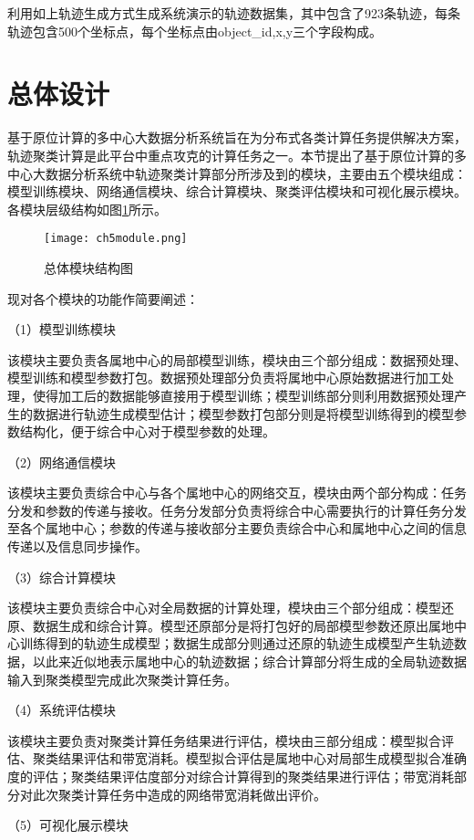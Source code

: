 利用如上轨迹生成方式生成系统演示的轨迹数据集，其中包含了923条轨迹，每条轨迹包含500个坐标点，每个坐标点由object\_id,x,y三个字段构成。

\section{总体设计}
基于原位计算的多中心大数据分析系统旨在为分布式各类计算任务提供解决方案，轨迹聚类计算是此平台中重点攻克的计算任务之一。本节提出了基于原位计算的多中心大数据分析系统中轨迹聚类计算部分所涉及到的模块，主要由五个模块组成：模型训练模块、网络通信模块、综合计算模块、聚类评估模块和可视化展示模块。各模块层级结构如图\ref{ch5module}所示。
\begin{figure}[H]
	\texttt{[image: ch5module.png]}
	\caption{总体模块结构图}
	\label{ch5module}
\end{figure}

现对各个模块的功能作简要阐述：

（1）模型训练模块

该模块主要负责各属地中心的局部模型训练，模块由三个部分组成：数据预处理、模型训练和模型参数打包。数据预处理部分负责将属地中心原始数据进行加工处理，使得加工后的数据能够直接用于模型训练；模型训练部分则利用数据预处理产生的数据进行轨迹生成模型估计；模型参数打包部分则是将模型训练得到的模型参数结构化，便于综合中心对于模型参数的处理。
 
（2）网络通信模块

该模块主要负责综合中心与各个属地中心的网络交互，模块由两个部分构成：任务分发和参数的传递与接收。任务分发部分负责将综合中心需要执行的计算任务分发至各个属地中心；参数的传递与接收部分主要负责综合中心和属地中心之间的信息传递以及信息同步操作。

（3）综合计算模块

该模块主要负责综合中心对全局数据的计算处理，模块由三个部分组成：模型还原、数据生成和综合计算。模型还原部分是将打包好的局部模型参数还原出属地中心训练得到的轨迹生成模型；数据生成部分则通过还原的轨迹生成模型产生轨迹数据，以此来近似地表示属地中心的轨迹数据；综合计算部分将生成的全局轨迹数据输入到聚类模型完成此次聚类计算任务。

（4）系统评估模块

该模块主要负责对聚类计算任务结果进行评估，模块由三部分组成：模型拟合评估、聚类结果评估和带宽消耗。模型拟合评估是属地中心对局部生成模型拟合准确度的评估；聚类结果评估度部分对综合计算得到的聚类结果进行评估；带宽消耗部分对此次聚类计算任务中造成的网络带宽消耗做出评价。

（5）可视化展示模块

